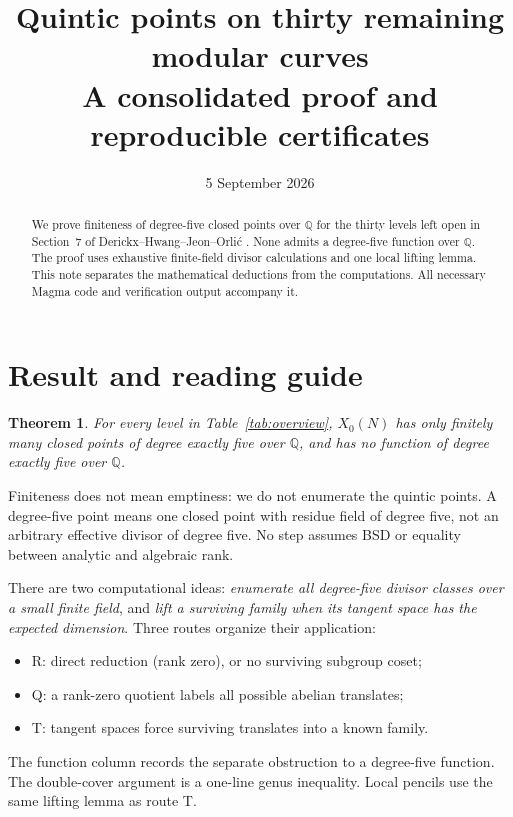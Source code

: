 \documentclass[11pt,a4paper]{article}
\title{Quintic points on thirty remaining modular curves\\
  \large A consolidated proof and reproducible certificates}
\author{}
\date{5 September 2026}
\newcommand{\Q}{\mathbb Q}
\newtheorem{theorem}{Theorem}
\begin{document}
\maketitle
\begin{abstract}
We prove finiteness of degree-five closed points over $\Q$ for the thirty
levels left open in Section~7 of Derickx--Hwang--Jeon--Orli\'c
\cite{DHJO}. None admits a degree-five function over $\Q$.
The proof uses exhaustive finite-field divisor calculations and one local
lifting lemma. This note separates the mathematical deductions from the
computations. All necessary Magma code and verification output accompany it.
\end{abstract}

\section{Result and reading guide}
\begin{theorem}\label{thm:main}
For every level in Table~\ref{tab:overview}, $X_0(N)$ has only finitely many
closed points of degree exactly five over $\Q$, and has no function of
degree exactly five over $\Q$.
\end{theorem}
Finiteness does not mean emptiness: we do not enumerate the quintic points.
A degree-five point means one closed point with residue field of degree
five, not an arbitrary effective divisor of degree five.
No step assumes BSD or equality between analytic and algebraic rank.

There are two computational ideas:
\emph{enumerate all degree-five divisor classes over a small finite field},
and \emph{lift a surviving family when its tangent space has the expected
dimension}. Three routes organize their application:
\begin{itemize}
\item R: direct reduction (rank zero), or no surviving subgroup coset;
\item Q: a rank-zero quotient labels all possible abelian translates;
\item T: tangent spaces force surviving translates into a known family.
\end{itemize}
The function column records the separate obstruction to a degree-five
function. The double-cover argument is a one-line genus inequality.
Local pencils use the same lifting lemma as route T.
\end{document}
